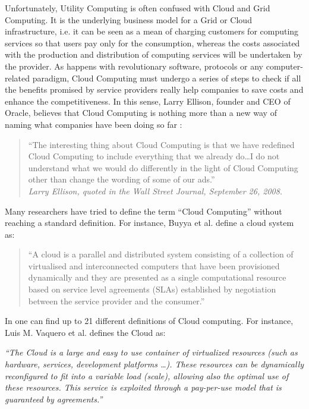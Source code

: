 Unfortunately, Utility Computing is often confused with Cloud and Grid Computing. It 
is the underlying business model for a Grid or Cloud infrastructure, i.e. it
can be seen as a mean of charging customers  for computing services so that 
users pay only for the consumption, whereas the costs associated with the production and distribution of computing services 
will be undertaken by the provider. As happens with revolutionary software, 
protocols or any computer-related paradigm, Cloud Computing must undergo 
a series of steps to check if all the benefits 
promised by service providers really help companies to save costs and enhance the competitiveness. 
In this sense, Larry Ellison, founder and CEO of Oracle, believes that Cloud Computing 
is nothing more than a new way of naming what companies have been doing so far \cite{Armbrust2009}: 
\begin{quote}
``The interesting thing about Cloud Computing is that we have redefined Cloud Computing 
to include everything that we already do\ldots I do not understand what we would do differently in the light of Cloud
Computing other than change the wording of some of our ads.''\\
\emph{Larry Ellison, quoted in the Wall Street Journal, September 26, 2008.}
\end{quote}
Many researchers have tried to define the term ``Cloud Computing'' without reaching 
a standard definition. For instance, Buyya et al. \cite{Buyya2011} define a cloud system as:
\begin{quote}
``A cloud is a parallel and distributed system consisting of a collection of 
virtualised and interconnected computers that have been provisioned dynamically 
and they are presented as a single computational resource based on service level agreements (SLAs) 
established by negotiation between the service provider and the consumer.''
\end{quote} 

In \cite{Vaquero2008} one can find up to 21 different definitions of Cloud computing. For instance, Luis M. Vaquero et al. defines the Cloud as:
\begin{center}
\emph{``The Cloud is a large and easy to use container of virtualized resources 
(such as hardware, services, development platforms \ldots). These resources can be 
dynamically reconfigured to fit into a variable load (scale), allowing also the optimal use of these resources. 
This service is exploited through a pay-per-use model that is guaranteed by agreements.''}
\end{center} 

